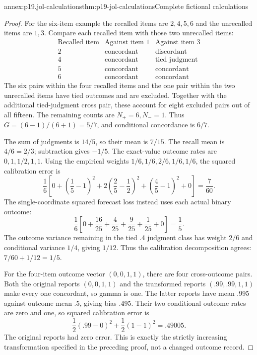 \begin{annexitem}{annex:p19.jol-calculations}{thm:p19-jol-calculations}{Complete fictional calculations}
\begin{proof}
For the six-item example the recalled items are \(2,4,5,6\)
and the unrecalled items are \(1,3\).
Compare each recalled item with those two unrecalled items:
\[
\begin{array}{c|cc}
\text{Recalled item}&\text{Against item 1}&\text{Against item 3}\\\hline
2&\text{concordant}&\text{discordant}\\
4&\text{concordant}&\text{tied judgment}\\
5&\text{concordant}&\text{concordant}\\
6&\text{concordant}&\text{concordant}
\end{array}
\]
The six pairs within the four recalled items and the one
pair within the two unrecalled items have tied outcomes
and are excluded. Together with the additional tied-judgment
cross pair, these account for eight excluded pairs out of
all fifteen. The remaining counts are \(N_+=6,N_-=1\).
Thus \(G=(6-1)/(6+1)=5/7\), and conditional concordance
is \(6/7\).

The sum of judgments is \(14/5\), so their mean is \(7/15\).
The recall mean is \(4/6=2/3\); subtraction gives \(-1/5\).
The exact-value outcome rates are \(0,1,1/2,1,1\).
Using the empirical weights \(1/6,1/6,2/6,1/6,1/6\),
the squared calibration error is
\[
\frac16\left[
 0+\left(\frac15-1\right)^2
 +2\left(\frac25-\frac12\right)^2
 +\left(\frac45-1\right)^2+0\right]
=\frac{7}{60}.
\]
The single-coordinate squared forecast loss instead uses
each actual binary outcome:
\[
\frac16\left[
0+\frac{16}{25}+\frac4{25}+\frac9{25}+\frac1{25}+0
\right]=\frac15.
\]
The outcome variance remaining in the tied .4 judgment class
has weight \(2/6\) and conditional variance \(1/4\), giving
\(1/12\). Thus the calibration decomposition agrees:
\(7/60+1/12=1/5\).

For the four-item outcome vector \((0,0,1,1)\), there are four
cross-outcome pairs. Both the original reports \((0,0,1,1)\)
and the transformed reports \((.99,.99,1,1)\) make every one
concordant, so gamma is one. The latter reports have mean
.995 against outcome mean .5, giving bias .495.
Their two conditional outcome rates are zero and one,
so squared calibration error is
\[
\frac12(.99-0)^2+\frac12(1-1)^2=.49005.
\]
The original reports had zero error. This is exactly the
strictly increasing transformation specified in the preceding
proof, not a changed outcome record.


\end{proof}
\end{annexitem}
